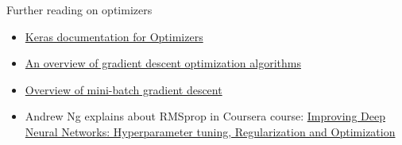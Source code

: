 \documentclass[
  ignorenonframetext,
]{beamer}
\providecommand{\tightlist}{%
  \setlength{\itemsep}{0pt}\setlength{\parskip}{0pt}}
\begin{document}
\begin{frame}
\begin{block}{Further reading on optimizers}
\protect\hypertarget{further-reading-on-optimizers}{}
\begin{itemize}
\tightlist
\item
  \href{https://keras.io/optimizers/}{Keras documentation for
  Optimizers}
\item
  \href{http://ruder.io/optimizing-gradient-descent/index.html}{An
  overview of gradient descent optimization algorithms}
\item
  \href{http://www.cs.toronto.edu/~tijmen/csc321/slides/lecture_slides_lec6.pdf}{Overview
  of mini-batch gradient descent}
\item
  Andrew Ng explains about RMSprop in Coursera course:
  \href{https://www.coursera.org/learn/deep-neural-network/lecture/BhJlm/rmsprop}{Improving
  Deep Neural Networks: Hyperparameter tuning, Regularization and
  Optimization}
\end{itemize}
\end{block}
\end{frame}
\end{document}
